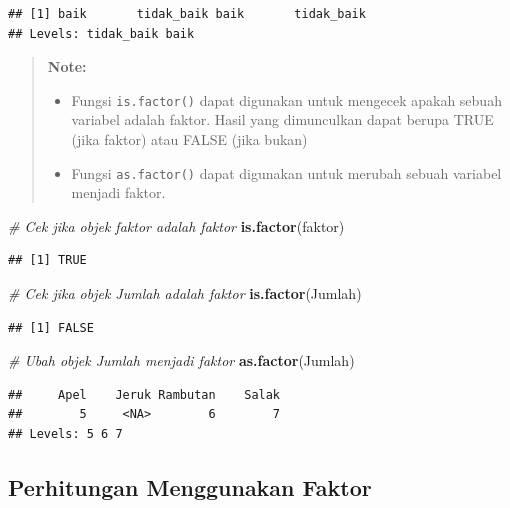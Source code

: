 \documentclass[]{book}
\newenvironment{Shaded}{\begin{snugshade}}{\end{snugshade}}
\newcommand{\KeywordTok}[1]{\textcolor[rgb]{0.13,0.29,0.53}{\textbf{#1}}}
\newcommand{\CommentTok}[1]{\textcolor[rgb]{0.56,0.35,0.01}{\textit{#1}}}
\newcommand{\NormalTok}[1]{#1}
\providecommand{\tightlist}{%
  \setlength{\itemsep}{0pt}\setlength{\parskip}{0pt}}
\begin{document}
\begin{verbatim}
## [1] baik       tidak_baik baik       tidak_baik
## Levels: tidak_baik baik
\end{verbatim}

\begin{quote}
\textbf{Note: }

\begin{itemize}
\tightlist
\item
  Fungsi \texttt{is.factor()} dapat digunakan untuk mengecek apakah
  sebuah variabel adalah faktor. Hasil yang dimunculkan dapat berupa
  TRUE (jika faktor) atau FALSE (jika bukan)
\item
  Fungsi \texttt{as.factor()} dapat digunakan untuk merubah sebuah
  variabel menjadi faktor.
\end{itemize}
\end{quote}

\begin{Shaded}
\begin{Highlighting}[]
\CommentTok{# Cek jika objek faktor adalah faktor}
\KeywordTok{is.factor}\NormalTok{(faktor)}
\end{Highlighting}
\end{Shaded}

\begin{verbatim}
## [1] TRUE
\end{verbatim}

\begin{Shaded}
\begin{Highlighting}[]
\CommentTok{# Cek jika objek Jumlah adalah faktor}
\KeywordTok{is.factor}\NormalTok{(Jumlah)}
\end{Highlighting}
\end{Shaded}

\begin{verbatim}
## [1] FALSE
\end{verbatim}

\begin{Shaded}
\begin{Highlighting}[]
\CommentTok{# Ubah objek Jumlah menjadi faktor}
\KeywordTok{as.factor}\NormalTok{(Jumlah)}
\end{Highlighting}
\end{Shaded}

\begin{verbatim}
##     Apel    Jeruk Rambutan    Salak 
##        5     <NA>        6        7 
## Levels: 5 6 7
\end{verbatim}

\subsection{Perhitungan Menggunakan
Faktor}\label{perhitungan-menggunakan-faktor}
\end{document}

